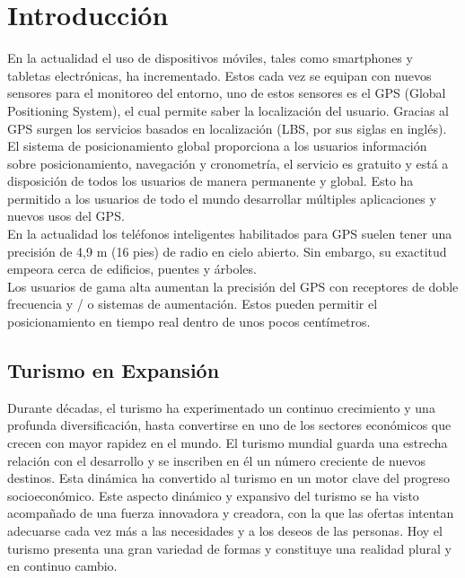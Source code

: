 \chapter{Introducción}

En la actualidad el uso de dispositivos móviles, tales como smartphones y tabletas electrónicas, ha incrementado. Estos cada vez se equipan con nuevos sensores para el monitoreo del entorno, uno de estos sensores es el GPS (Global Positioning System), el cual permite saber la localización del usuario. Gracias al GPS surgen los servicios basados en localización (LBS, por sus siglas en inglés).\\

El sistema de posicionamiento global proporciona a los usuarios información sobre posicionamiento, navegación y cronometría, el servicio es gratuito y está a disposición de todos los usuarios de manera permanente y global. Esto  ha permitido a los usuarios de todo el mundo desarrollar múltiples aplicaciones y nuevos usos del GPS.\\

En la actualidad los teléfonos inteligentes habilitados para GPS suelen tener una precisión de 4,9 m (16 pies) de radio en cielo abierto. Sin embargo, su exactitud empeora cerca de edificios, puentes y árboles.\\

Los usuarios de gama alta aumentan la precisión del GPS con receptores de doble frecuencia y / o sistemas de aumentación. Estos pueden permitir el posicionamiento en tiempo real dentro de unos pocos centímetros.\cite{gps}



\section{Turismo en Expansión}



Durante décadas, el turismo ha experimentado un continuo crecimiento y una profunda diversificación, hasta convertirse en uno de los sectores económicos que crecen con mayor rapidez en el mundo. El turismo mundial guarda una estrecha relación con el desarrollo y se inscriben en él un número creciente de nuevos destinos. Esta dinámica ha convertido al turismo en un motor clave del progreso socioeconómico.
Este aspecto dinámico y expansivo del turismo se ha visto acompañado de una fuerza innovadora y creadora, con la que las ofertas intentan adecuarse cada vez más a las necesidades y a los deseos de las personas. Hoy el turismo presenta una gran variedad de formas y constituye una realidad plural y en continuo cambio.


